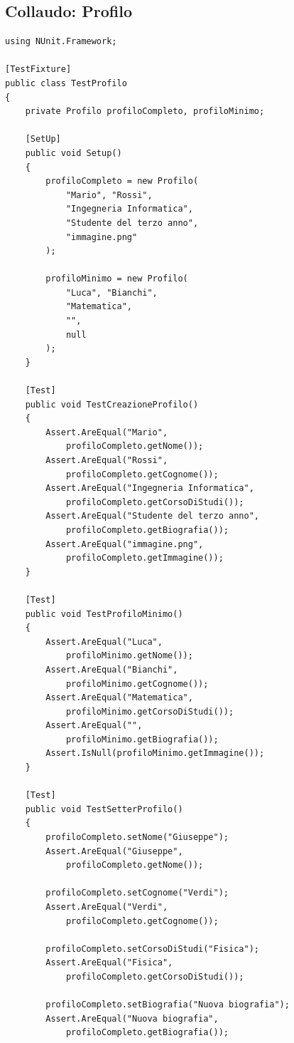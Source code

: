 \documentclass[12pt,a4paper]{report}
\begin{document}
\subsection{Collaudo: Profilo}
\begin{lstlisting}
using NUnit.Framework;

[TestFixture]
public class TestProfilo
{
    private Profilo profiloCompleto, profiloMinimo;

    [SetUp]
    public void Setup()
    {
        profiloCompleto = new Profilo(
            "Mario", "Rossi",
            "Ingegneria Informatica",
            "Studente del terzo anno",
            "immagine.png"
        );

        profiloMinimo = new Profilo(
            "Luca", "Bianchi",
            "Matematica",
            "",
            null
        );
    }

    [Test]
    public void TestCreazioneProfilo()
    {
        Assert.AreEqual("Mario",
            profiloCompleto.getNome());
        Assert.AreEqual("Rossi",
            profiloCompleto.getCognome());
        Assert.AreEqual("Ingegneria Informatica",
            profiloCompleto.getCorsoDiStudi());
        Assert.AreEqual("Studente del terzo anno",
            profiloCompleto.getBiografia());
        Assert.AreEqual("immagine.png",
            profiloCompleto.getImmagine());
    }

    [Test]
    public void TestProfiloMinimo()
    {
        Assert.AreEqual("Luca",
            profiloMinimo.getNome());
        Assert.AreEqual("Bianchi",
            profiloMinimo.getCognome());
        Assert.AreEqual("Matematica",
            profiloMinimo.getCorsoDiStudi());
        Assert.AreEqual("",
            profiloMinimo.getBiografia());
        Assert.IsNull(profiloMinimo.getImmagine());
    }

    [Test]
    public void TestSetterProfilo()
    {
        profiloCompleto.setNome("Giuseppe");
        Assert.AreEqual("Giuseppe",
            profiloCompleto.getNome());

        profiloCompleto.setCognome("Verdi");
        Assert.AreEqual("Verdi",
            profiloCompleto.getCognome());

        profiloCompleto.setCorsoDiStudi("Fisica");
        Assert.AreEqual("Fisica",
            profiloCompleto.getCorsoDiStudi());

        profiloCompleto.setBiografia("Nuova biografia");
        Assert.AreEqual("Nuova biografia",
            profiloCompleto.getBiografia());


\end{lstlisting}
\end{document}
